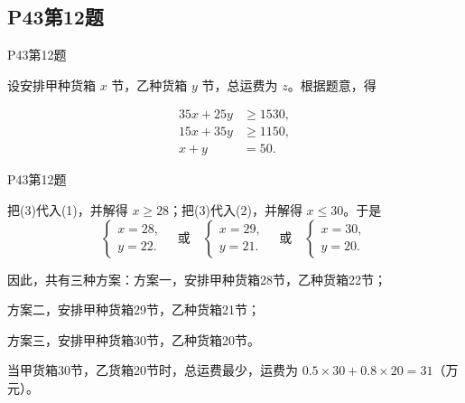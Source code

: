 \documentclass[12pt,aspectratio=169,t,fleqn]{beamer}
\begin{document}
\subsection{P43第12题}
\begin{frame}{P43第12题}
	\begin{solution}
		\upshape
		设安排甲种货箱 $x$ 节，乙种货箱 $y$ 节，总运费为 $z$。根据题意，得
	
		\begin{align}
			35x+25y &\ge 1530, \tag{1}\\
			15x+35y &\ge 1150, \tag{2}\\
			x+y &= 50. \tag{3}
		\end{align}
		
		
		
	\end{solution}
\end{frame}


\begin{frame}{P43第12题}
	\begin{solution}[接上页]
		\upshape
		把(3)代入(1)，并解得 $x\ge 28$；把(3)代入(2)，并解得 $x\le 30$。于是
		\[
		\begin{cases}
			x=28,\\
			y=22.
		\end{cases}
		\quad\text{或}\quad
		\begin{cases}
			x=29,\\
			y=21.
		\end{cases}
		\quad\text{或}\quad
		\begin{cases}
			x=30,\\
			y=20.
		\end{cases}
		\]
		
		因此，共有三种方案：方案一，安排甲种货箱28节，乙种货箱22节；
		
		方案二，安排甲种货箱29节，乙种货箱21节；
		
		方案三，安排甲种货箱30节，乙种货箱20节。
		
		当甲货箱30节，乙货箱20节时，总运费最少，运费为 $0.5\times 30+0.8\times 20=31$（万元）。
	\end{solution}
\end{frame}

\begin{frame}{}
	
\end{frame}
\end{document}
